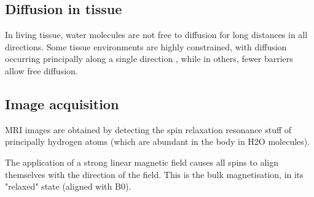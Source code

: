 \subsection{Diffusion in tissue}

In living tissue, water molecules are not free to diffusion for long distances in all directions. Some tissue environments are highly constrained, with diffusion occurring principally along a single direction , while in others, fewer barriers allow free diffusion.

\subsection{Image acquisition}

MRI images are obtained by detecting the spin relaxation resonance stuff of principally hydrogen atoms (which are abundant in the body in H2O molecules).

The application of a strong linear magnetic field causes all spins to align themselves with the direction of the field. This is the bulk magnetisation, in its "relaxed" state (aligned with B0).






